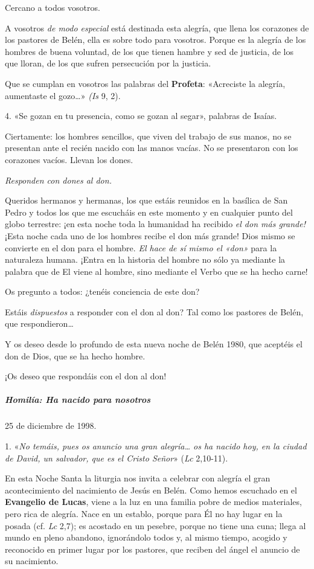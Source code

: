 \documentclass[]{article}
\let\oldsubparagraph\subparagraph
\renewcommand{\subparagraph}[1]{\oldsubparagraph{#1}\mbox{}}
\begin{document}
Cercano a todos vosotros.

A vosotros \emph{de modo especial} está destinada esta alegría, que
llena los corazones de los pastores de Belén, ella es sobre todo para
vosotros. Porque es la alegría de los hombres de buena voluntad, de los
que tienen hambre y sed de justicia, de los que lloran, de los que
sufren persecución por la justicia.

Que se cumplan en vosotros las palabras del \textbf{Profeta}: «Acreciste
la alegría, aumentaste el gozo\ldots{}» \emph{(Is} 9, 2).

4. «Se gozan en tu presencia, como se gozan al segar», palabras de
Isaías.

Ciertamente: los hombres sencillos, que viven del trabajo de sus manos,
no se presentan ante el recién nacido con las manos vacías. No se
presentaron con los corazones vacíos. Llevan los dones.

\emph{Responden con dones al don.}

Queridos hermanos y hermanas, los que estáis reunidos en la basílica de
San Pedro y todos los que me escucháis en este momento y en cualquier
punto del globo terrestre: ¡en esta noche toda la humanidad ha recibido
\emph{el don más grande!} ¡Esta noche cada uno de los hombres recibe el
don más grande! Dios mismo se convierte en el don para el hombre.
\emph{El hace de sí mismo el «don»} para la naturaleza humana. ¡Entra en
la historia del hombre no sólo ya mediante la palabra que de El viene al
hombre, sino mediante el Verbo que se ha hecho carne!

Os pregunto a todos: ¿tenéis conciencia de este don?

Estáis \emph{dispuestos} a responder con el don al don? Tal como los
pastores de Belén, que respondieron\ldots{}

Y os deseo desde lo profundo de esta nueva noche de Belén 1980, que
aceptéis el don de Dios, que se ha hecho hombre.

¡Os deseo que respondáis con el don al don!

\subparagraph{Homilía: Ha nacido para
nosotros}\label{homiluxeda-ha-nacido-para-nosotros}

25 de diciembre de 1998.

1. «\emph{No temáis, pues os anuncio una gran alegría\ldots{} os ha
nacido hoy, en la ciudad de David, un salvador, que es el Cristo Señor}»
(\emph{Lc} 2,10-11).

En esta Noche Santa la liturgia nos invita a celebrar con alegría el
gran acontecimiento del nacimiento de Jesús en Belén. Como hemos
escuchado en el \textbf{Evangelio de Lucas}, viene a la luz en una
familia pobre de medios materiales, pero rica de alegría. Nace en un
establo, porque para Él no hay lugar en la posada (cf. \emph{Lc} 2,7);
es acostado en un pesebre, porque no tiene una cuna; llega al mundo en
pleno abandono, ignorándolo todos y, al mismo tiempo, acogido y
reconocido en primer lugar por los pastores, que reciben del ángel el
anuncio de su nacimiento.
\end{document}
